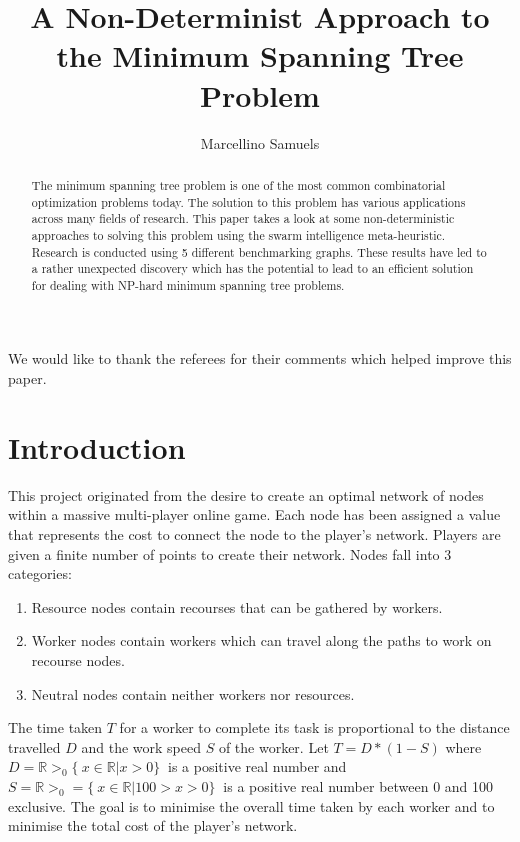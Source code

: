 \documentclass{AISB2008}
\begin{document}
\title{A Non-Determinist Approach to the Minimum Spanning Tree Problem}

\author{Marcellino Samuels }

\maketitle



\begin{abstract}
The minimum spanning tree problem is one of the most common combinatorial optimization problems today. The solution to this problem has various applications across many fields of research. This paper takes a look at some non-deterministic approaches to solving this problem using the swarm intelligence meta-heuristic. Research is conducted using 5 different benchmarking graphs. These results have led to a rather unexpected discovery which has the potential to lead to an efficient solution for dealing with NP-hard minimum spanning tree problems.
\end{abstract}

\ack
We would like to thank the referees for their comments which helped improve
this paper.

\tableofcontents

\section{Introduction}


This project originated from the desire to create an optimal network of nodes within a massive multi-player online game. Each node has been assigned a value that represents the cost to connect the node to the player’s network. Players are given a finite number of points to create their network. Nodes fall into 3 categories:

\begin{enumerate}
\item Resource nodes contain recourses that can be gathered by workers.
\item Worker nodes contain workers which can travel along the paths to work on recourse nodes.
\item Neutral nodes contain neither workers nor resources.
\end {enumerate}

The time taken {$T$} for a worker to complete its task is proportional to the distance travelled {$D$} and the work speed {$S$} of the worker. Let {$T = D * (1 - S)$} where {$D = {\mathbb{R}}>_0 \{\ x \in {\mathbb{R} | x > 0\}\ }$} is a positive real number and {$S = {\mathbb{R}}>_0 = \{\ x \in {\mathbb{R}} | 100 > x > 0 \}\  $} is a positive real number between 0 and 100 exclusive. The goal is to minimise the overall time taken by each worker and to minimise the total cost of the player’s network.
\end{document}

